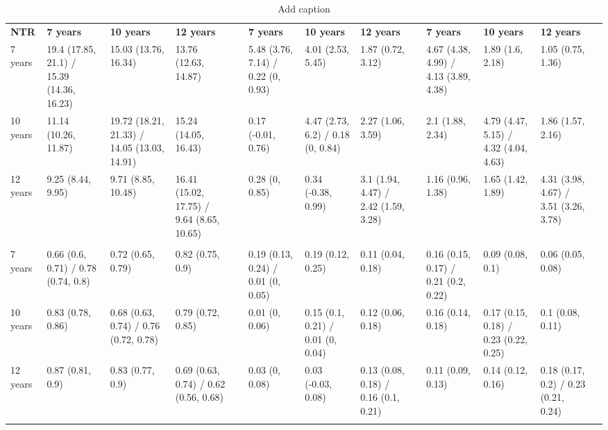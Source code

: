 \begin{table}[htbp]
  \centering
  \caption{Add caption}
    \begin{tabular}{llllrlllrlllr}
\cmidrule{2-4}\cmidrule{6-8}\cmidrule{10-12}    \textbf{NTR} & \textbf{7 years} & \textbf{10 years} & \textbf{12 years} &       & \textbf{7 years} & \textbf{10 years} & \textbf{12 years} &       & \textbf{7 years} & \textbf{10 years} & \textbf{12 years} &  \\
\cmidrule{1-12}    7 years & 19.4 (17.85, 21.1) / 15.39 (14.36, 16.23) & 15.03 (13.76, 16.34) & 13.76 (12.63, 14.87) &       & 5.48 (3.76, 7.14) / 0.22 (0, 0.93) & 4.01 (2.53, 5.45) & 1.87 (0.72, 3.12) &       & 4.67 (4.38, 4.99) / 4.13 (3.89, 4.38) & 1.89 (1.6, 2.18) & 1.05 (0.75, 1.36) &  \\
    10 years & 11.14 (10.26, 11.87) & 19.72 (18.21, 21.33) / 14.05 (13.03, 14.91) & 15.24 (14.05, 16.43) &       & 0.17 (-0.01, 0.76) & 4.47 (2.73, 6.2) / 0.18 (0, 0.84) & 2.27 (1.06, 3.59) &       & 2.1 (1.88, 2.34) & 4.79 (4.47, 5.15) / 4.32 (4.04, 4.63) & 1.86 (1.57, 2.16) &  \\
    12 years & 9.25 (8.44, 9.95) & 9.71 (8.85, 10.48) & 16.41 (15.02, 17.75) / 9.64 (8.65, 10.65) &       & 0.28 (0, 0.85) & 0.34 (-0.38, 0.99) & 3.1 (1.94, 4.47) / 2.42 (1.59, 3.28) &       & 1.16 (0.96, 1.38) & 1.65 (1.42, 1.89) & 4.31 (3.98, 4.67) / 3.51 (3.26, 3.78) &  \\
          & \multicolumn{3}{r}{}  &       & \multicolumn{3}{c}{}  &       & \multicolumn{3}{c}{}  &  \\
    7 years & 0.66 (0.6, 0.71) / 0.78 (0.74, 0.8) & 0.72 (0.65, 0.79) & 0.82 (0.75, 0.9) &       & 0.19 (0.13, 0.24) / 0.01 (0, 0.05) & 0.19 (0.12, 0.25) & 0.11 (0.04, 0.18) &       & 0.16 (0.15, 0.17) / 0.21 (0.2, 0.22) & 0.09 (0.08, 0.1) & 0.06 (0.05, 0.08) &  \\
    10 years & 0.83 (0.78, 0.86) & 0.68 (0.63, 0.74) / 0.76 (0.72, 0.78) & 0.79 (0.72, 0.85) &       & 0.01 (0, 0.06) & 0.15 (0.1, 0.21) / 0.01 (0, 0.04) & 0.12 (0.06, 0.18) &       & 0.16 (0.14, 0.18) & 0.17 (0.15, 0.18) / 0.23 (0.22, 0.25) & 0.1 (0.08, 0.11) &  \\
    12 years & 0.87 (0.81, 0.9) & 0.83 (0.77, 0.9) & 0.69 (0.63, 0.74) / 0.62 (0.56, 0.68) &       & 0.03 (0, 0.08) & 0.03 (-0.03, 0.08) & 0.13 (0.08, 0.18) / 0.16 (0.1, 0.21) &       & 0.11 (0.09, 0.13) & 0.14 (0.12, 0.16) & 0.18 (0.17, 0.2) / 0.23 (0.21, 0.24) &  \\
          & \multicolumn{3}{c}{}  &       & \multicolumn{3}{c}{}  &       & \multicolumn{3}{c}{}  &  \\

\end{tabular}
\end{table}
